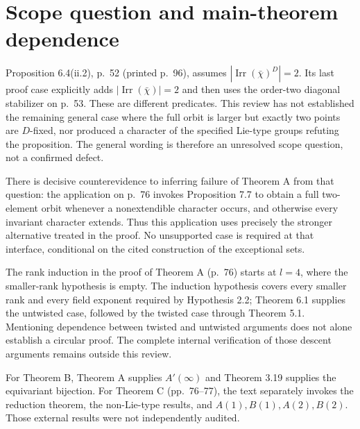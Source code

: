 \documentclass[10pt]{article}
\begin{document}
\section*{Scope question and main-theorem dependence}
Proposition 6.4(ii.2), p. 52 (printed p. 96), assumes \(|\operatorname{Irr}(\bar\chi)^D|=2\). Its last proof case explicitly adds \(|\operatorname{Irr}(\bar\chi)|=2\) and then uses the order-two diagonal stabilizer on p. 53. These are different predicates. This review has not established the remaining general case where the full orbit is larger but exactly two points are \(D\)-fixed, nor produced a character of the specified Lie-type groups refuting the proposition. The general wording is therefore an unresolved scope question, not a confirmed defect.\par
There is decisive counterevidence to inferring failure of Theorem A from that question: the application on p. 76 invokes Proposition 7.7 to obtain a full two-element orbit whenever a nonextendible character occurs, and otherwise every invariant character extends. Thus this application uses precisely the stronger alternative treated in the proof. No unsupported case is required at that interface, conditional on the cited construction of the exceptional sets.\par
The rank induction in the proof of Theorem A (p. 76) starts at \(l=4\), where the smaller-rank hypothesis is empty. The induction hypothesis covers every smaller rank and every field exponent required by Hypothesis 2.2; Theorem 6.1 supplies the untwisted case, followed by the twisted case through Theorem 5.1. Mentioning dependence between twisted and untwisted arguments does not alone establish a circular proof. The complete internal verification of those descent arguments remains outside this review.\par
For Theorem B, Theorem A supplies \(A'(\infty)\) and Theorem 3.19 supplies the equivariant bijection. For Theorem C (pp. 76–77), the text separately invokes the reduction theorem, the non-Lie-type results, and \(A(1),B(1),A(2),B(2)\). Those external results were not independently audited.\par
\end{document}
